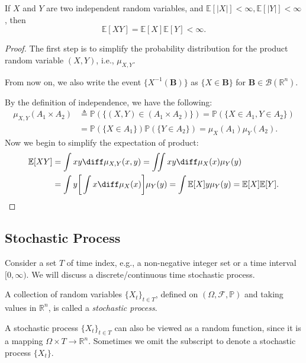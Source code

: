 \begin{proposition}
If $X$ and $Y$ are two independent random variables,
and $\mathbb{E}[|X|]<\infty, \mathbb{E}[|Y|]<\infty$, then
\[
\mathbb{E}[XY] = \mathbb{E}[X]
\mathbb{E}[Y]<\infty.
\]
\end{proposition}
\begin{proof}
The first step is to simplify the probability distribution for the product random variable $(X,Y)$, i.e., $\mu_{X,Y}$.
\begin{remark}
From now on, we also write the event 
$\{X^{-1}(\bm B)\}$ as $\{X\in\bm B\}$ for $\bm B\in\mathcal{B}(\mathbb{R}^n)$.
\end{remark}
By the definition of independence, we have the following:
\begin{align*}
\mu_{X,Y}(A_1\times A_2)&\triangleq 
\mathbb{P}(\{(X,Y)\in (A_1\times A_2)\})
=\mathbb{P}(\{X\in A_1, Y\in A_2\})\\
&=\mathbb{P}(\{X\in A_1\})\mathbb{P}(\{Y\in A_2\})
=\mu_X(A_1)\mu_Y(A_2).
\end{align*}
Now we begin to simplify the expectation of product:
\begin{align*}
\mathbb{E}[XY]&=\int xy\diff\mu_{X,Y}(x,y)
=\iint xy\diff\mu_{X}(x)\mu_Y(y)\\
&=
\int y\bigg[
\int x\diff\mu_{X}(x)
\bigg]\mu_Y(y)=\int \mathbb{E}[X]y\mu_Y(y)=\mathbb{E}[X]\mathbb{E}[Y].
\end{align*}


\end{proof}








\subsection{Stochastic Process}

Consider a set $T$ of time index, e.g., a non-negative integer set or a time interval $[0,\infty)$.
We will discuss a discrete/continuous time stochastic process.
\begin{definition}
A collection of random variables $\{X_t\}_{t\in T}$, defined on $(\Omega,\mathcal{F},\mathbb{P})$ and taking values in $\mathbb{R}^n$, is called a \emph{stochastic process}.
\end{definition}
\begin{remark}
A stochastic process $\{X_t\}_{t\in T}$ can also be viewed as a random function, since it is a mapping $\Omega\times T\to \mathbb{R}^n$.
Sometimes we omit the subscript to denote a stochastic process $\{X_t\}$.
\end{remark}

